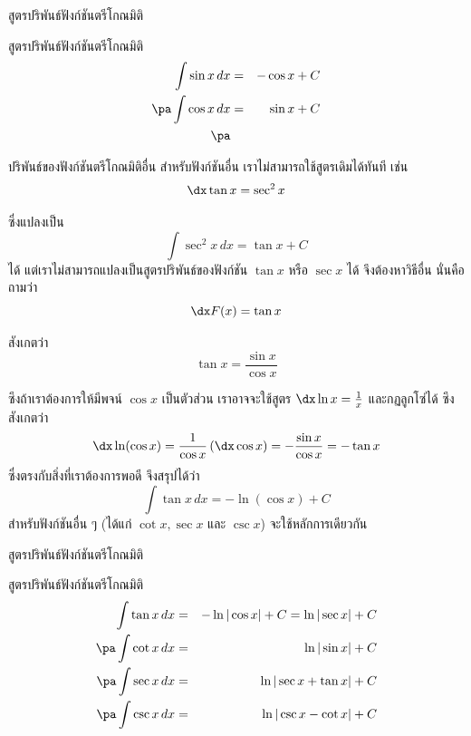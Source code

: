 \begin{frame}{สูตรปริพันธ์ฟังก์ชันตรีโกณมิติ}
\begin{thm}{สูตรปริพันธ์ฟังก์ชันตรีโกณมิติ}{}
\begin{eqnarray*}
\int \sin x \, dx &=& - \cos x + C \\ \pa
\int \cos x \, dx &=& \sin x + C \\ \pa
\end{eqnarray*}
\end{thm}
\end{frame}

\begin{frame}[t]{ปริพันธ์ของฟังก์ชันตรีโกณมิติอื่น}
สำหรับฟังก์ชันอื่น เราไม่สามารถใช้สูตรเดิมได้ทันที เช่น
\[ \dx \tan x = \sec^2 x\]
\begin{slide}
ซึ่งแปลงเป็น 
\[\int \sec^2 x \, dx = \tan x + C\]
ได้ แต่เราไม่สามารถแปลงเป็นสูตรปริพันธ์ของฟังก์ชัน $\tan x$ หรือ $\sec x$ ได้ จึงต้องหาวิธีอื่น นั่นคือถามว่า
\[ \dx F(x) = \tan x \]
\end{slide}
\end{frame}

\begin{frame}[t]
สังเกตว่า 
\[\tan x = \frac{\sin x}{\cos x}\] 
\begin{slide}
ซึงถ้าเราต้องการให้มีพจน์ $\cos x$ เป็นตัวส่วน เราอาจจะใช้สูตร $\dx \ln x = \frac{1}{x}$ และกฏลูกโซ่ได้ ซึงสังเกตว่า
\[ \dx \ln (\cos x) = \frac{1}{\cos x} \left(\dx \cos x\right) = -\frac{\sin x}{\cos x} = - \tan x\]
ซึ่งตรงกับสิ่งที่เราต้องการพอดี จึงสรุปได้ว่า
\[ \int \tan x \, dx = - \ln (\cos x) + C\]
สำหรับฟังก์ชันอื่น ๆ (ได้แก่ $\cot x, \sec x$ และ $\csc x$) จะใช้หลักการเดียวกัน
\end{slide}
\end{frame}

\begin{frame}{สูตรปริพันธ์ฟังก์ชันตรีโกณมิติ}
\begin{thm}{สูตรปริพันธ์ฟังก์ชันตรีโกณมิติ}{}
\begin{eqnarray*}
\int \tan x \, dx &=& - \ln | \cos x| + C = \ln | \sec x| + C\\ \pa 
\int \cot x \, dx &=& \ln | \sin x | + C\\ \pa 
\int \sec x \, dx &=& \ln | \sec x + \tan x | + C \\ \pa 
\int \csc x \, dx &=& \ln | \csc x - \cot x| + C
\end{eqnarray*}
\end{thm}
\end{frame}

